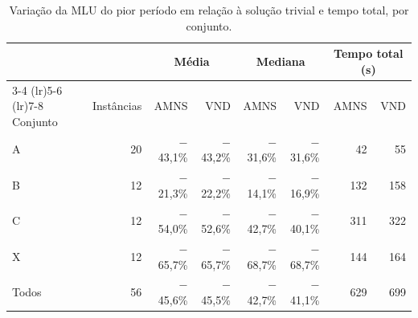 \begin{table}[H]
\centering
\caption{Variação da MLU do pior período em relação à solução trivial e tempo total, por conjunto.}
\label{tab:conjuntos}
\begin{tabular}{lrrrrrrr}
\toprule
 & & \multicolumn{2}{c}{Média} & \multicolumn{2}{c}{Mediana} & \multicolumn{2}{c}{Tempo total (s)} \\
\cmidrule(lr){3-4} \cmidrule(lr){5-6} \cmidrule(lr){7-8}
Conjunto & Instâncias & AMNS & VND & AMNS & VND & AMNS & VND \\
\midrule
A & 20 & $-$43{,}1\% & $-$43{,}2\% & $-$31{,}6\% & $-$31{,}6\% & 42 & 55 \\
B & 12 & $-$21{,}3\% & $-$22{,}2\% & $-$14{,}1\% & $-$16{,}9\% & 132 & 158 \\
C & 12 & $-$54{,}0\% & $-$52{,}6\% & $-$42{,}7\% & $-$40{,}1\% & 311 & 322 \\
X & 12 & $-$65{,}7\% & $-$65{,}7\% & $-$68{,}7\% & $-$68{,}7\% & 144 & 164 \\
\midrule
Todos & 56 & $-$45{,}6\% & $-$45{,}5\% & $-$42{,}7\% & $-$41{,}1\% & 629 & 699 \\
\bottomrule
\end{tabular}
\end{table}
